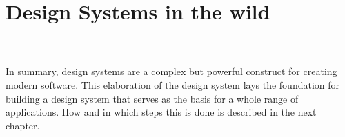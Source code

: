 \newpage
\section{Design Systems in the wild}\label{design_systems}

%
\\
\\
In summary, design systems are a complex but powerful construct for creating modern software. This elaboration of the design system lays the foundation for building a design system that serves as the basis for a whole range of applications. How and in which steps this is done is described in the next chapter.